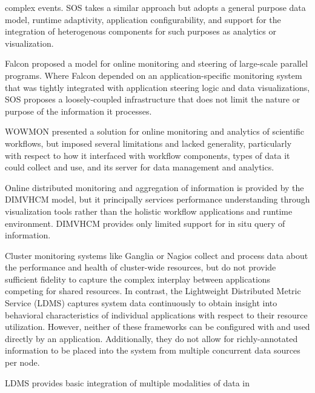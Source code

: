 complex events.
%
SOS takes a similar approach but adopts a general purpose data model,
runtime adaptivity, application configurability, and support for the
integration of heterogenous components for such purposes as analytics
or visualization.
%
\par
%
Falcon \cite{gu1995falcon} proposed a model for online monitoring
and steering of large-scale parallel programs.
%
Where Falcon depended on an application-specific monitoring system
that was tightly integrated with application steering logic and data
visualizations, SOS proposes a loosely-coupled infrastructure that
does not limit the nature or purpose of the information it processes.
%
\par
%
WOWMON \cite{zhang2016wowmon} presented a solution for online
monitoring and analytics of scientific workflows, but imposed several
limitations and lacked generality, particularly with respect to how it
interfaced with workflow components, types of data it could collect
and use, and its server for data management and analytics.
%
\par
%
Online distributed monitoring and aggregation of information is
provided by the DIMVHCM \cite{tesser2012dimvhcm} model, but it
principally services performance understanding through visualization
tools rather than the holistic workflow applications and runtime
environment.
%
DIMVHCM provides only limited support for in situ query of information.
%
\par
%
Cluster monitoring systems like Ganglia \cite{massie2004ganglia} or
Nagios \cite{katsaros2011building} collect and process data about the
performance and health of cluster-wide resources, but do not provide
sufficient fidelity to capture the complex interplay between
applications competing for shared resources.
%
In contrast, the Lightweight Distributed Metric Service
\cite{agelastos2014lightweight} (LDMS) captures system data
continuously to obtain insight into behavioral characteristics of
individual applications with respect to their resource utilization.
%
%
However, neither of these frameworks can be configured with and used
directly by an application.
%
Additionally, they do not allow for richly-annotated information to be
placed into the system from multiple concurrent data sources per node.
%
\par
%
LDMS provides basic integration of multiple modalities of data in
